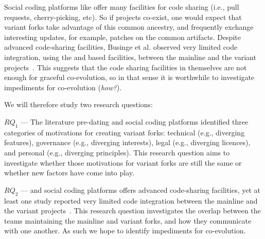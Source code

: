 Social coding platforms like \gh offer many facilities for code sharing (i.e., pull requests, cherry-picking, etc).
So if projects co-exist, one would expect that variant forks take advantage of this common ancestry, and frequently exchange interesting updates, for example, patches on the common artifacts.
Despite advanced code-sharing facilities, Businge et al. observed very limited code integration, using the \git and \gh based facilities, between the mainline and the variant projects~\cite{businge:emse:2021}.
This suggests that the code sharing facilities in themselves are not enough for graceful co-evolution, so in that sense it is worthwhile to investigate impediments for co-evolution (\textit{how?}).


\noindent
We will therefore study two research questions:

 $RQ_1$ --- \textit{\RQOne}
The literature pre-dating \git and social coding platforms identified three categories of motivations for creating variant forks: technical (e.g., diverging features), governance (e.g., diverging interests), legal (e.g., diverging licences), and personal (e.g., diverging principles).
This research question aims to investigate whether those motivations for variant forks are still the same or whether new factors have come into play. 

$RQ_2$ --- \textit{\RQTwo}
\git and social coding platforms offers advanced code-sharing facilities, yet at least one study reported very limited code integration between the mainline and the variant projects~\cite{businge:emse:2021}.
This research question investigates the overlap between the teams maintaining the mainline and variant forks, and how they communicate with one another.
As such we hope to identify impediments for co-evolution.


